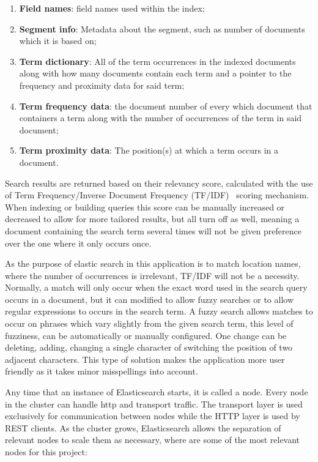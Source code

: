 \begin{enumerate}
    \item \textbf{Field names}: field names used within the index;
    \item \textbf{Segment info}: Metadata about the segment, such as number of documents which it is based on;
    \item \textbf{Term dictionary}: All of the term occurrences in the indexed documents along with how many documents contain each term and a pointer to the frequency and proximity data for said term;
    \item \textbf{Term frequency data}: the document number of every which document that containers a term along with the number of occurrences of the term in said document;
    \item \textbf{Term proximity data}: The position(s) at which a term occurs in a document.
\end{enumerate}

Search results are returned based on their relevancy score, calculated with the use of Term Frequency/Inverse Document Frequency (TF/IDF)~\cite{8780663} scoring mechanism. When indexing or building queries this score can be manually increased or decreased to allow for more tailored results, but all turn off as well, meaning a document containing the search term several times will not be given preference over the one where it only occurs once. 

As the purpose of elastic search in this application is to match location names, where the number of occurrences is irrelevant, TF/IDF will not be a necessity. Normally, a match will only occur when the exact word used in the search query occurs in a document, but it can modified to allow fuzzy searches or to allow regular expressions to occurs in the search term. A fuzzy search allows matches to occur on phrases which vary slightly from the given search term, this level of fuzziness, can be automatically or manually configured. One change can be deleting, adding, changing a single character of switching the position of two adjacent characters. This type of solution makes the application more user friendly as it takes minor misspellings into account.

Any time that an instance of Elasticsearch starts, it is called a node. Every node in the cluster can handle \acrshort{http} and transport traffic. The transport layer is used exclusively for communication between nodes while the HTTP layer is used by REST clients. As the cluster grows, Elasticsearch allows the separation of relevant nodes to scale them as necessary, where are some of the most relevant nodes for this project:

